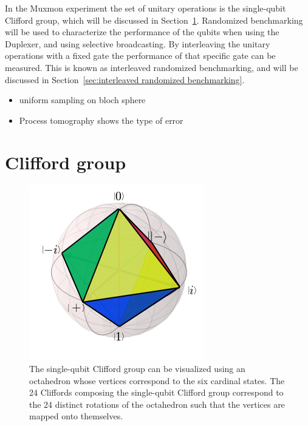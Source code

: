       In the Muxmon experiment the set of unitary operations is the single-qubit Clifford group, which will be discussed in Section~\ref{sec:Clifford group}. Randomized benchmarking will be used to characterize the performance of the qubits when using the Duplexer, and using selective broadcasting. By interleaving the unitary operations with a fixed gate the performance of that specific gate can be measured. This is known as interleaved randomized benchmarking, and will be discussed in Section~\ref{sec:interleaved randomized benchmarking}.

      \begin{itemize}
        \item uniform sampling on bloch sphere
        \item Process tomography shows the type of error
      \end{itemize}

    \section{Clifford group}
      \label{sec:Clifford group}

      \begin{figure}[h]%
        \begin{center}
          \includegraphics[width=.5\textwidth]{../Figures/Randomized benchmarking/Bloch sphere octahedron.png}
        \end{center}
        \caption{The single-qubit Clifford group can be visualized using an octahedron whose vertices correspond to the six cardinal states. The 24 Cliffords composing the single-qubit Clifford group correspond to the 24 distinct rotations of the octahedron such that the vertices are mapped onto themselves.}
        \label{fig:Clifford octahedron}
      \end{figure}

